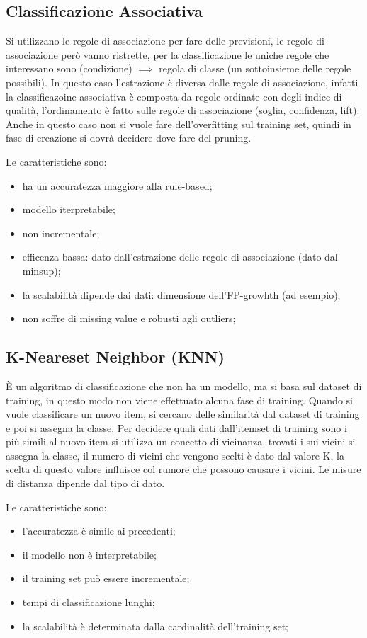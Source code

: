 \documentclass[12pt]{article}
\begin{document}
\subsection{Classificazione Associativa}
Si utilizzano le regole di associazione per fare delle previsioni, le regolo di associazione per\`o vanno ristrette, per la classificazione le uniche regole che interessano sono (condizione) $ \implies $ regola di classe (un sottoinsieme delle regole possibili). In questo caso l'estrazione \`e diversa dalle regole di associazione, infatti la classificazoine associativa \`e composta da regole ordinate con degli indice di qualit\`a, l'ordinamento \`e fatto sulle regole di associazione (soglia, confidenza, lift). Anche in questo caso non si vuole fare dell'overfitting sul training set, quindi in fase di creazione si dovr\`a decidere dove fare del pruning.

Le caratteristiche sono:
\begin{itemize}
    \item ha un accuratezza maggiore alla rule-based;
    \item modello iterpretabile;
    \item non incrementale;
    \item efficenza bassa: dato dall'estrazione delle regole di associazione (dato dal minsup);
    \item la scalabilit\`a dipende dai dati: dimensione dell'FP-growhth (ad esempio);
    \item non soffre di missing value e robusti agli outliers;
\end{itemize}


\subsection{K-Neareset Neighbor (KNN)}
\`E un algoritmo di classificazione che non ha un modello, ma si basa sul dataset di training, in questo modo non viene effettuato alcuna fase di training. Quando si vuole classificare un nuovo item, si cercano delle similarit\`a dal dataset di training e poi si assegna la classe. Per decidere quali dati dall'itemset di training sono i pi\`u simili al nuovo item si utilizza un concetto di vicinanza, trovati i sui vicini si assegna la classe, il numero di vicini che vengono scelti \`e dato dal valore K, la scelta di questo valore influisce col rumore che possono causare i vicini. Le misure di distanza dipende dal tipo di dato.

Le caratteristiche sono:
\begin{itemize}
    \item l'accuratezza \`e simile ai precedenti;
    \item il modello non \`e interpretabile;
    \item il training set pu\`o essere incrementale;
    \item tempi di classificazione lunghi;
    \item la scalabilit\`a \`e determinata dalla cardinalit\`a dell'training set;
\end{itemize}
\end{document}
